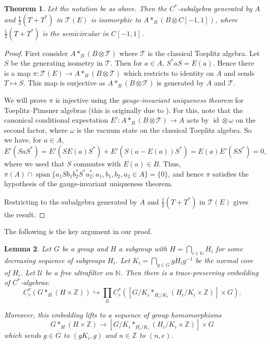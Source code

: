 \documentclass[10pt]{amsart}
\newtheorem{thm}{Theorem}[section]
\newtheorem{lem}[thm]{Lemma}
\theoremstyle{definition}
\newcommand{\N}{\ensuremath{\mathbb{N}}}
\newcommand{\Z}{\ensuremath{\mathbb{Z}}}
\newcommand{\cU}{\ensuremath{\mathcal{U}}}
\newcommand{\cT}{\ensuremath{\mathcal{T}}}
\begin{document}
\begin{thm}\label{isomorphism thm}
    Let the notation be as above. Then the $C^*$-subalgebra generated by $A$ and $\frac{1}{2}(T+T^*)$ in $\cT(E)$ is isomorphic to $A\ast_{B} (B\otimes C[-1,1])$, where $\frac{1}{2}(T+T^*)$ is the semicircular in $C[-1,1]$.
\end{thm}
\begin{proof}
    First consider $A\ast_B (B\otimes \cT)$ where $\cT$ is the classical Toeplitz algebra. Let $S$ be the generating isometry in $\cT$. Then for $a\in A$, $S^*aS= E(a)$. Hence there is a map $\pi:\cT(E)\to A\ast_B (B\otimes \cT)$ which restricts to identity on $A$ and sends $T\mapsto S$. This map is surjective as $A\ast_B (B\otimes \cT)$ is generated by $A$ and $\cT$.

    We will prove $\pi$ is injective using the \emph{gauge-invariant uniqueness theorem} for Toeplitz--Pimsner algebras \cite[Theorem 4.6.18]{brown2008textrm} (this is originally due to \cite{FowlerMuhlyRaeburn2003}). For this, note that the canonical conditional expectation $E':A\ast_B (B\otimes \cT)\to A$ acts by $\operatorname{id}\otimes \omega$ on the second factor, where $\omega$ is the vacuum state on the classical Toeplitz algebra. So we have, for $a \in A$,
    \[E'(SaS^*) = E'(SE(a)S^*)+E'(S(a-E(a))S^*)= E(a)E'(SS^*)=0,\]
    where we used that $S$ commutes with $E(a)\in B$. Thus, $\pi(A)\cap \overline{\operatorname{span}}\{a_1 Sb_1 b_2^*S^* a_2^*:a_1,b_1,b_2,a_2 \in A\}=\{0\}$, and hence $\pi$ satisfies the hypothesis of the gauge-invariant uniqueness theorem.

    Restricting to the subalgebra generated by $A$ and $\frac{1}{2}(T+T^*)$ in $\cT(E)$ gives the result.
\end{proof}




The following is the key argument in our proof. 

\begin{lem}\label{lem:2.3}
    Let $G$ be a group and $H$ a subgroup with $H=\bigcap_{i\in \N} H_i$ for some decreasing sequence of subgroups $H_i$. Let $K_i = \bigcap_{g \in G} gH_ig^{-1}$ be the normal core of $H_i$. Let $\cU$ be a free ultrafilter on $\N$. Then there is a trace-preserving embedding of $C^*$-algebras:
    \[C_r^*(G\ast_H (H\times\Z)) \hookrightarrow \prod_\cU C_r^*([G/K_i\ast_{H_i/K_i} (H_i/K_i\times\Z)] \times G).\]

    Moreover, this embedding lifts to a sequence of group homomorphisms
    \[G \ast_H (H \times \Z) \to [G/K_i\ast_{H_i/K_i} (H_i/K_i\times\Z)] \times G\] which sends $g\in G$ to $(gK_i, g)$ and $n\in \Z$ to $(n,e)$. 

\end{lem}
\end{document}
